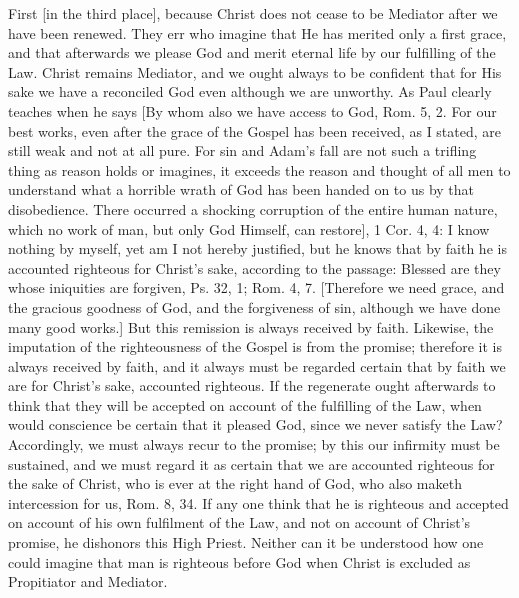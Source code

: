 First [in the third place], because Christ does not cease to be
Mediator after we have been renewed.  They err who imagine that He
has merited only a first grace, and that afterwards we please God and
merit eternal life by our fulfilling of the Law.  Christ remains
Mediator, and we ought always to be confident that for His sake we
have a reconciled God even although we are unworthy.  As Paul clearly
teaches when he says [By whom also we have access to God, Rom. 5, 2.
For our best works, even after the grace of the Gospel has been
received, as I stated, are still weak and not at all pure.  For sin
and Adam's fall are not such a trifling thing as reason holds or
imagines, it exceeds the reason and thought of all men to understand
what a horrible wrath of God has been handed on to us by that
disobedience.  There occurred a shocking corruption of the entire
human nature, which no work of man, but only God Himself, can
restore], 1 Cor. 4, 4: I know nothing by myself, yet am I not hereby
justified, but he knows that by faith he is accounted righteous for
Christ's sake, according to the passage: Blessed are they whose
iniquities are forgiven, Ps. 32, 1; Rom. 4, 7. [Therefore we need
grace, and the gracious goodness of God, and the forgiveness of sin,
although we have done many good works.] But this remission is always
received by faith.  Likewise, the imputation of the righteousness of
the Gospel is from the promise; therefore it is always received by
faith, and it always must be regarded certain that by faith we are
for Christ's sake, accounted righteous.  If the regenerate ought
afterwards to think that they will be accepted on account of the
fulfilling of the Law, when would conscience be certain that it
pleased God, since we never satisfy the Law?  Accordingly, we must
always recur to the promise; by this our infirmity must be sustained,
and we must regard it as certain that we are accounted righteous for
the sake of Christ, who is ever at the right hand of God, who also
maketh intercession for us, Rom. 8, 34. If any one think that he is
righteous and accepted on account of his own fulfilment of the Law,
and not on account of Christ's promise, he dishonors this High Priest.
Neither can it be understood how one could imagine that man is
righteous before God when Christ is excluded as Propitiator and
Mediator.

